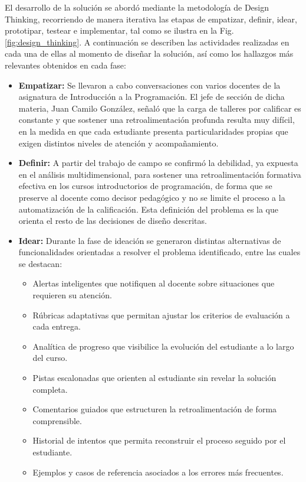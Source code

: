 \documentclass[letterpaper, 10 pt, conference]{ieeeconf}
\begin{document}
El desarrollo de la solución se abordó mediante la metodología de Design Thinking, recorriendo de manera iterativa las etapas de empatizar, definir, idear, prototipar, testear e implementar, tal como se ilustra en la Fig. \ref{fig:design_thinking}. A continuación se describen las actividades realizadas en cada una de ellas al momento de diseñar la solución, así como los hallazgos más relevantes obtenidos en cada fase:

\begin{itemize}
	\item \textbf{Empatizar:} Se llevaron a cabo conversaciones con varios docentes de la asignatura de Introducción a la Programación. El jefe de sección de dicha materia, Juan Camilo González, señaló que la carga de talleres por calificar es constante y que sostener una retroalimentación profunda resulta muy difícil, en la medida en que cada estudiante presenta particularidades propias que exigen distintos niveles de atención y acompañamiento.
	\item \textbf{Definir:} A partir del trabajo de campo se confirmó la debilidad, ya expuesta en el análisis multidimensional, para sostener una retroalimentación formativa efectiva en los cursos introductorios de programación, de forma que se preserve al docente como decisor pedagógico y no se limite el proceso a la automatización de la calificación. Esta definición del problema es la que orienta el resto de las decisiones de diseño descritas.
	\item \textbf{Idear:} Durante la fase de ideación se generaron distintas alternativas de funcionalidades orientadas a resolver el problema identificado, entre las cuales se destacan:
	\begin{itemize}
		\item Alertas inteligentes que notifiquen al docente sobre situaciones que requieren su atención.
		\item Rúbricas adaptativas que permitan ajustar los criterios de evaluación a cada entrega.
		\item Analítica de progreso que visibilice la evolución del estudiante a lo largo del curso.
		\item Pistas escalonadas que orienten al estudiante sin revelar la solución completa.
		\item Comentarios guiados que estructuren la retroalimentación de forma comprensible.
		\item Historial de intentos que permita reconstruir el proceso seguido por el estudiante.
		\item Ejemplos y casos de referencia asociados a los errores más frecuentes.

\end{itemize}
\end{itemize}
\end{document}
